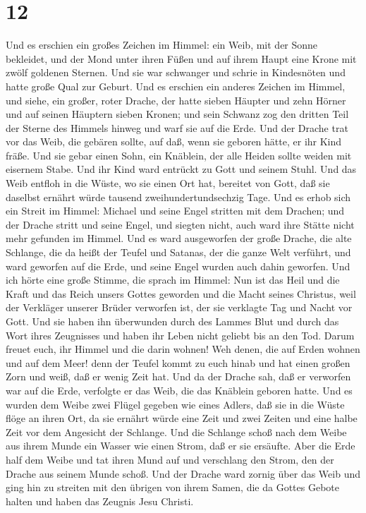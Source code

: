 \hypertarget{section-11}{%
\section{12}\label{section-11}}

 Und es erschien ein großes Zeichen im Himmel: ein Weib, mit
der Sonne bekleidet, und der Mond unter ihren Füßen und auf ihrem Haupt
eine Krone mit zwölf goldenen Sternen.  Und sie war
schwanger und schrie in Kindesnöten und hatte große Qual zur Geburt.
 Und es erschien ein anderes Zeichen im Himmel, und siehe,
ein großer, roter Drache, der hatte sieben Häupter und zehn Hörner und
auf seinen Häuptern sieben Kronen;  und sein Schwanz zog den
dritten Teil der Sterne des Himmels hinweg und warf sie auf die Erde.
Und der Drache trat vor das Weib, die gebären sollte, auf daß, wenn sie
geboren hätte, er ihr Kind fräße.  Und sie gebar einen Sohn,
ein Knäblein, der alle Heiden sollte weiden mit eisernem Stabe. Und ihr
Kind ward entrückt zu Gott und seinem Stuhl.  Und das Weib
entfloh in die Wüste, wo sie einen Ort hat, bereitet von Gott, daß sie
daselbst ernährt würde tausend zweihundertundsechzig Tage. 
Und es erhob sich ein Streit im Himmel: Michael und seine Engel stritten
mit dem Drachen; und der Drache stritt und seine Engel,  und
siegten nicht, auch ward ihre Stätte nicht mehr gefunden im Himmel.
 Und es ward ausgeworfen der große Drache, die alte
Schlange, die da heißt der Teufel und Satanas, der die ganze Welt
verführt, und ward geworfen auf die Erde, und seine Engel wurden auch
dahin geworfen.  Und ich hörte eine große Stimme, die
sprach im Himmel: Nun ist das Heil und die Kraft und das Reich unsers
Gottes geworden und die Macht seines Christus, weil der Verkläger
unserer Brüder verworfen ist, der sie verklagte Tag und Nacht vor Gott.
 Und sie haben ihn überwunden durch des Lammes Blut und
durch das Wort ihres Zeugnisses und haben ihr Leben nicht geliebt bis an
den Tod.  Darum freuet euch, ihr Himmel und die darin
wohnen! Weh denen, die auf Erden wohnen und auf dem Meer! denn der
Teufel kommt zu euch hinab und hat einen großen Zorn und weiß, daß er
wenig Zeit hat.  Und da der Drache sah, daß er verworfen
war auf die Erde, verfolgte er das Weib, die das Knäblein geboren hatte.
 Und es wurden dem Weibe zwei Flügel gegeben wie eines
Adlers, daß sie in die Wüste flöge an ihren Ort, da sie ernährt würde
eine Zeit und zwei Zeiten und eine halbe Zeit vor dem Angesicht der
Schlange.  Und die Schlange schoß nach dem Weibe aus ihrem
Munde ein Wasser wie einen Strom, daß er sie ersäufte. 
Aber die Erde half dem Weibe und tat ihren Mund auf und verschlang den
Strom, den der Drache aus seinem Munde schoß.  Und der
Drache ward zornig über das Weib und ging hin zu streiten mit den
übrigen von ihrem Samen, die da Gottes Gebote halten und haben das
Zeugnis Jesu Christi.

